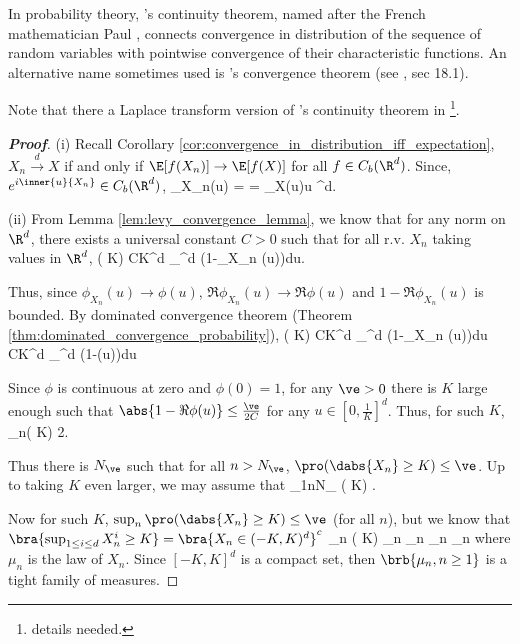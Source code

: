 \begin{remark}
In probability theory, \levy's continuity theorem, named after the French mathematician Paul \levy, connects convergence in distribution of the sequence of random variables with pointwise convergence of their characteristic functions. An alternative name sometimes used is \levy's convergence theorem (see \cite{Williams_1991}, sec 18.1).

Note that there a Laplace transform version of \levy's continuity theorem in \cite{Feller_1948}\footnote{details needed.}.
\end{remark}

\begin{proof}[\bf Proof]
\ben
\item [(i)] Recall Corollary \ref{cor:convergence_in_distribution_iff_expectation}, $X_n \stackrel{d}{\to} X$ if and only if $\E[ f (X_n)]\to \E[ f (X)]$ for all $f \in C_b(\R^d )$. Since, $e^{i\inner{u}{X_n}}\in C_b(\R^d)$,
\be
\phi_{X_n}(u) = \E {} \to \E {}= \phi_X(u)\quad \forall u \in \R^d.
\ee

\item [(ii)] From Lemma \ref{lem:levy_convergence_lemma}, we know that for any norm on $\R^d$, there exists a universal constant $C > 0$ such that for all r.v. $X_n$ taking values in $\R^d$,
\be
\pro( \geq K) \leq CK^d \int_{^d} (1-\Re\phi_{X_n} (u))du.
\ee

Thus, since $\phi_{X_n} (u) \to  \phi(u)$, $\Re \phi_{X_n} (u) \to  \Re \phi(u)$ and $1-\Re \phi_{X_n}(u)$ is bounded. By dominated convergence theorem (Theorem \ref{thm:dominated_convergence_probability}),
\be
\pro( \geq K) \leq CK^d \int_{^d} (1-\Re\phi_{X_n} (u))du \to CK^d \int_{^d} (1-\Re\phi (u))du
\ee

Since $\phi$ is continuous at zero and $\phi(0) = 1$, for any $\ve > 0$ there is $K$ large enough such that $\abs{1-\Re\phi(u)} \leq \frac{\ve}{2C}$ for any $u\in [0, \frac 1K ]^d$. Thus, for such $K$,
\be
\limsup_n\pro( \geq K) \leq \frac{\ve}2.
\ee

Thus there is $N_\ve$ such that for all $n > N_\ve$, $\pro(\dabs{X_n} \geq K) \leq \ve$. Up to taking $K$ even larger, we may assume that
\be
\sup_{1\leq n\leq N_\ve} \pro( \geq K) \leq \ve.
\ee

Now for such $K$, $\sup_n \pro(\dabs{X_n} \geq K) \leq \ve$ (for all $n$), but we know that $\bra{\sup_{1\leq i\leq d}X_n^i \geq K} = \bra{X_n \in (-K,K)^d}^c$
\be
\sup_n \pro( \geq K) \leq \ve\quad \lra\quad \sup_n \mu_n \leq \ve \quad\ra\quad \sup_n \mu_n\leq \ve
\ee
where $\mu_n$ is the law of $X_n$. Since $[-K, K]^d$ is a compact set, then $\brb{\mu_n,n\geq1}$ is a tight family of measures.


\end{proof}
